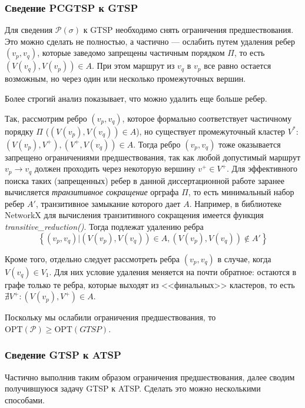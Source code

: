 \subsubsection{Сведение PCGTSP к GTSP}

Для сведения
$\mathcal P(\sigma)$
к GTSP
необходимо снять ограничения предшествования.
Это можно сделать не полностью, а частично ---
ослабить
путем удаления ребер
$(v_p, v_q)$, которые заведомо запрещены
частичным порядком $\Pi$,
то есть
$(V(v_q), V(v_p))\in A$.
При этом маршрут из $v_q$ в $v_p$
все равно остается возможным,
но через один или несколько промежуточных вершин.

Более строгий анализ показывает,
что можно удалить еще больше ребер.

Так, рассмотрим ребро
$(v_p, v_q)$,
которое формально соответствует частичному порядку $\Pi$
($(V(v_p), V(v_q))\in A$),
но существует промежуточный кластер $V^*$:
$(V(v_p), V^+), (V^+, V(v_q))\in A$.
Тогда ребро
$(v_p, v_q)$
тоже оказывается запрещено ограничениями предшествования,
так как любой допустимый маршрут
$v_p \to v_q$
должен проходить через некоторую вершину
$v^+ \in V^+$.
Для эффективного поиска таких
(запрещенных)
ребер
в данной диссертационной работе
заранее вычисляется
\textit{транзитивное сокращение}
орграфа $\Pi$,
то есть минимальный набор ребер
$A'$,
транзитивное замыкание которого дает $A$.
Например, в библиотеке NetworkX \cite{bi:NetworkX}
для вычисления транзитивного сокращения
имеется функция \textit{transitive\_reduction()}.
Тогда подлежат удалению ребра
$$
\left\{(v_p, v_q)|
  (V(v_p), V(v_q))\in A, (V(v_p), V(v_q))\notin A'\right\}
$$

Кроме того, отдельно следует рассмотреть ребра
$(v_p, v_q)$
в случае, когда
$V(v_q)\in V_1$.
Для них условие удаления меняется на почти обратное:
остаются в графе только те ребра,
которые выходят из <<финальных>> кластеров,
то есть
$\nexists V^+ \colon (V(v_p), V^+)\in A$.

Поскольку мы ослабили ограничения предшествования,
то
$\mathrm{OPT}(\mathcal P) \geqslant \mathrm{OPT}(GTSP)$.

\subsubsection{Сведение GTSP к ATSP}
Частично выполнив таким образом ограничения предшествования,
далее сводим получившуюся задачу GTSP
к ATSP. Сделать это можно несколькими способами.

